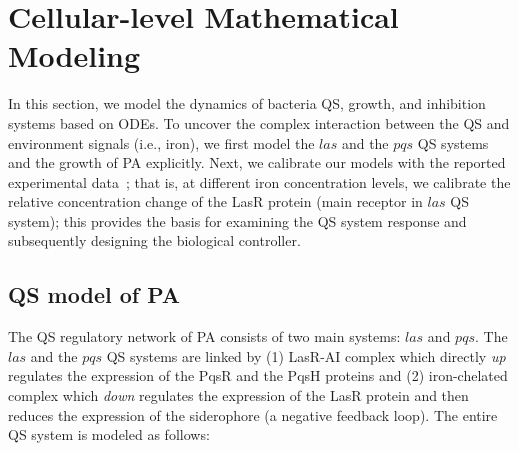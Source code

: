 \documentclass[runningheads]{llncs}
\begin{document}
\section{Cellular-level Mathematical Modeling}\label{Math}
In this section, we model the dynamics of bacteria QS, growth, and inhibition systems based on ODEs. To uncover the complex interaction between the QS and environment signals (i.e., iron), we first model the $las$ and the $pqs$ QS systems and the growth of PA explicitly. Next, we calibrate our models with the reported experimental data~\cite{Kim2005}; that is, at different iron concentration levels, we calibrate the relative concentration change of the LasR protein (main receptor in $las$ QS system); this provides the basis for examining the QS system response and subsequently designing the biological controller. 

 
\subsection{QS model of PA}
The QS regulatory network of PA consists of two main systems: $las$ and $pqs$.  The $las$ and the $pqs$ QS systems are linked by (1) LasR-AI complex which directly \textit{up} regulates the expression of the PqsR and the PqsH proteins and (2) iron-chelated complex which \textit{down} regulates the expression of the LasR protein and then reduces the expression of the siderophore (a negative feedback loop). The entire QS system is modeled as follows:
  
\end{document}
